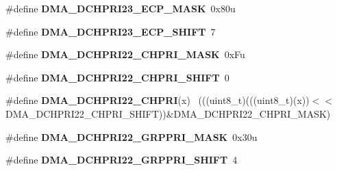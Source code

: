 \begin{DoxyCompactItemize}
\item 
\hypertarget{group___d_m_a___register___masks_gaadc3b4bbbf6bd0b647c8dc051e240a77}{}\#define {\bfseries D\+M\+A\+\_\+\+D\+C\+H\+P\+R\+I23\+\_\+\+E\+C\+P\+\_\+\+M\+A\+S\+K}~0x80u\label{group___d_m_a___register___masks_gaadc3b4bbbf6bd0b647c8dc051e240a77}

\item 
\hypertarget{group___d_m_a___register___masks_ga131d3266935c1cb77f2699d8eeb64dd1}{}\#define {\bfseries D\+M\+A\+\_\+\+D\+C\+H\+P\+R\+I23\+\_\+\+E\+C\+P\+\_\+\+S\+H\+I\+F\+T}~7\label{group___d_m_a___register___masks_ga131d3266935c1cb77f2699d8eeb64dd1}

\item 
\hypertarget{group___d_m_a___register___masks_gac7625cd807978d1a54666084feb12943}{}\#define {\bfseries D\+M\+A\+\_\+\+D\+C\+H\+P\+R\+I22\+\_\+\+C\+H\+P\+R\+I\+\_\+\+M\+A\+S\+K}~0x\+Fu\label{group___d_m_a___register___masks_gac7625cd807978d1a54666084feb12943}

\item 
\hypertarget{group___d_m_a___register___masks_ga3ec949807b0dd578dec17805437fecd1}{}\#define {\bfseries D\+M\+A\+\_\+\+D\+C\+H\+P\+R\+I22\+\_\+\+C\+H\+P\+R\+I\+\_\+\+S\+H\+I\+F\+T}~0\label{group___d_m_a___register___masks_ga3ec949807b0dd578dec17805437fecd1}

\item 
\hypertarget{group___d_m_a___register___masks_gabfcfe9d3f51f2f7c7ba3f77077ec7739}{}\#define {\bfseries D\+M\+A\+\_\+\+D\+C\+H\+P\+R\+I22\+\_\+\+C\+H\+P\+R\+I}(x)                                    ~(((uint8\+\_\+t)(((uint8\+\_\+t)(x))$<$$<$D\+M\+A\+\_\+\+D\+C\+H\+P\+R\+I22\+\_\+\+C\+H\+P\+R\+I\+\_\+\+S\+H\+I\+F\+T))\&D\+M\+A\+\_\+\+D\+C\+H\+P\+R\+I22\+\_\+\+C\+H\+P\+R\+I\+\_\+\+M\+A\+S\+K)\label{group___d_m_a___register___masks_gabfcfe9d3f51f2f7c7ba3f77077ec7739}

\item 
\hypertarget{group___d_m_a___register___masks_gab5df95af673345f6647ca2bd90685cfe}{}\#define {\bfseries D\+M\+A\+\_\+\+D\+C\+H\+P\+R\+I22\+\_\+\+G\+R\+P\+P\+R\+I\+\_\+\+M\+A\+S\+K}~0x30u\label{group___d_m_a___register___masks_gab5df95af673345f6647ca2bd90685cfe}

\item 
\hypertarget{group___d_m_a___register___masks_ga52ca7a328026b99e0e7220004a6c5920}{}\#define {\bfseries D\+M\+A\+\_\+\+D\+C\+H\+P\+R\+I22\+\_\+\+G\+R\+P\+P\+R\+I\+\_\+\+S\+H\+I\+F\+T}~4\label{group___d_m_a___register___masks_ga52ca7a328026b99e0e7220004a6c5920}


\end{DoxyCompactItemize}
